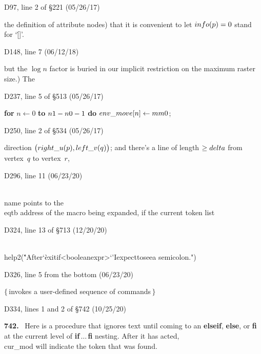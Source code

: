 \bugonpage D97, line 2 of \S221 (05/26/17)

\tenpoint\noindent
the definition of attribute nodes) that
it is convenient to let $\\{info}(p)=0$ stand for `\.{[]}'.

\goodbreak
\bugonpage D148, line 7 (06/12/18)

\tenpoint\noindent
but the $\log n$ factor is buried in our
implicit restriction on the maximum raster size.) The\cutpar

\bugonpage D237, line 5 of \S513 (05/26/17)

\ninepoint\noindent\quad
{\bf for} $n\gets0$ {\bf to} $\\{n1}-\\{n0}-1$ {\bf do} $\\{env\_move}[n]\gets\\{mm0}$;

\bugonpage D250, line 2 of \S534 (05/26/17)

\tenpoint\noindent
direction $\bigl(\\{right\_u}(p),\\{left\_v}(q)\bigr)$;
and there's a line of length $\ge\\{delta}$ from vertex~$q$ to vertex~$r$,\cutpar

\bugonpage D296, line 11 (06/23/20)

\tenpoint\noindent
\\{name} points to the \\{eqtb} address of the macro
being expanded, if the current token list\cutpar

\bugonpage D324, line 13 of \S713 (12/20/20)

\ninepoint\noindent\qquad\quad
\\{help2}(\.{"After\]\char`\`exitif\]<boolean\]expr>\char`\'\]I\]expect\]to\]see\]a\]%
semicolon."})

\bugonpage D326, line 5 from the bottom (06/23/20)

\ninepoint\noindent\qquad\qquad
$\{\,$invokes a user-defined sequence of commands$\,\}$

\bugonpage D334, lines 1 and 2 of \S742 (10/25/20)

\tenpoint\noindent
{\bf 742.} \ Here is a procedure that ignores text until coming to an {\bf elseif},
{\bf else}, or {\bf fi} at the current level of {\bf if}$\,\ldots\,${\bf fi}
nesting. After it has acted, \\{cur\_mod} will indicate the token that
was found.

